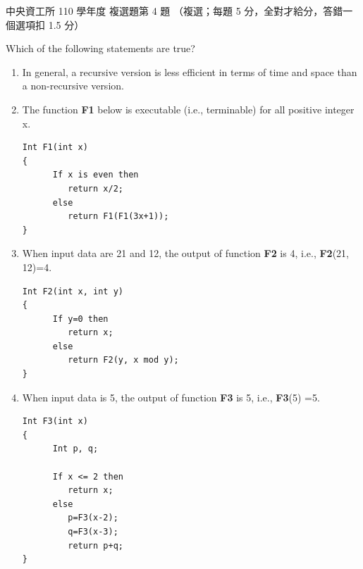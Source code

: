\begin{pastexam}[label={px:ncu-110-dsa-04}]{中央資工所 110 學年度 複選題第 4 題}
（複選；每題 5 分，全對才給分，答錯一個選項扣 1.5 分）

Which of the following statements are true?
\begin{enumerate}[label=(\Alph*)]
\item In general, a recursive version is less efficient in terms of time and space than a
non-recursive version.
\item The function \textbf{F1} below is executable (i.e., terminable) for all positive integer x.
\begin{verbatim}
Int F1(int x)
{
      If x is even then
         return x/2;
      else
         return F1(F1(3x+1));
}
\end{verbatim}
\item When input data are 21 and 12, the output of function \textbf{F2} is 4, i.e.,
\textbf{F2}(21, 12)=4.
\begin{verbatim}
Int F2(int x, int y)
{
      If y=0 then
         return x;
      else
         return F2(y, x mod y);
}
\end{verbatim}
\item When input data is 5, the output of function \textbf{F3} is 5, i.e., \textbf{F3}(5) =5.
\begin{verbatim}
Int F3(int x)
{
      Int p, q;

      If x <= 2 then
         return x;
      else
         p=F3(x-2);
         q=F3(x-3);
         return p+q;
}
\end{verbatim}
\end{enumerate}
\end{pastexam}

